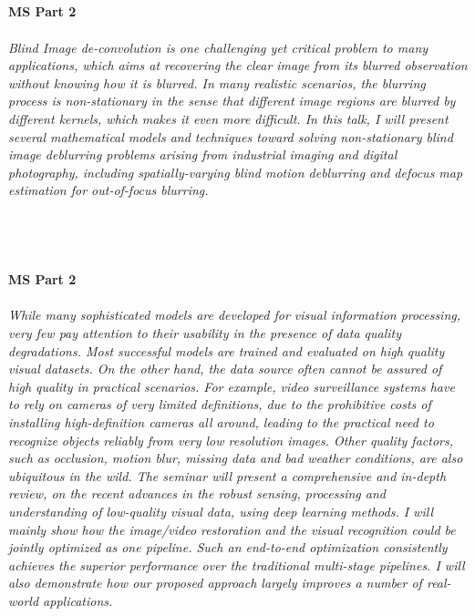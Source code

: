 \begin{multicols}{2}
\\ 
    \\
    \\\\
    \noindent\textbf{MS Part 2}\\
\\  
    \textit{Blind Image de-convolution is one challenging yet critical problem to many applications, which aims at recovering the clear image from its blurred observation without knowing how it is blurred. In many realistic scenarios, the blurring process is non-stationary in the sense that different image regions are blurred by different kernels, which makes it even more difficult. In this talk, I will present several mathematical models and techniques toward solving non-stationary blind image deblurring problems arising from industrial imaging and digital photography, including spatially-varying blind motion deblurring and defocus map estimation for out-of-focus blurring.}\\
\\ 
    \\
    \\\\
    \noindent\textbf{MS Part 2}\\
\\  
    \textit{While many sophisticated models are developed for visual information processing, very few pay attention to their usability in the presence of data quality degradations. Most successful models are trained and evaluated on high quality visual datasets. On the other hand, the data source often cannot be assured of high quality in practical scenarios. For example, video surveillance systems have to rely on cameras of very limited definitions, due to the prohibitive costs of installing high-definition cameras all around, leading to the practical need to recognize objects reliably from very low resolution images. Other quality factors, such as occlusion, motion blur, missing data and bad weather conditions, are also ubiquitous in the wild. The seminar will present a comprehensive and in-depth review, on the recent advances in the robust sensing, processing and understanding of low-quality visual data, using deep learning methods. I will mainly show how the image/video restoration and the visual recognition could be jointly optimized as one pipeline. Such an end-to-end optimization consistently achieves the superior performance over the traditional multi-stage pipelines. I will also demonstrate how our proposed approach largely improves a number of real-world applications.}\\

\end{multicols}

